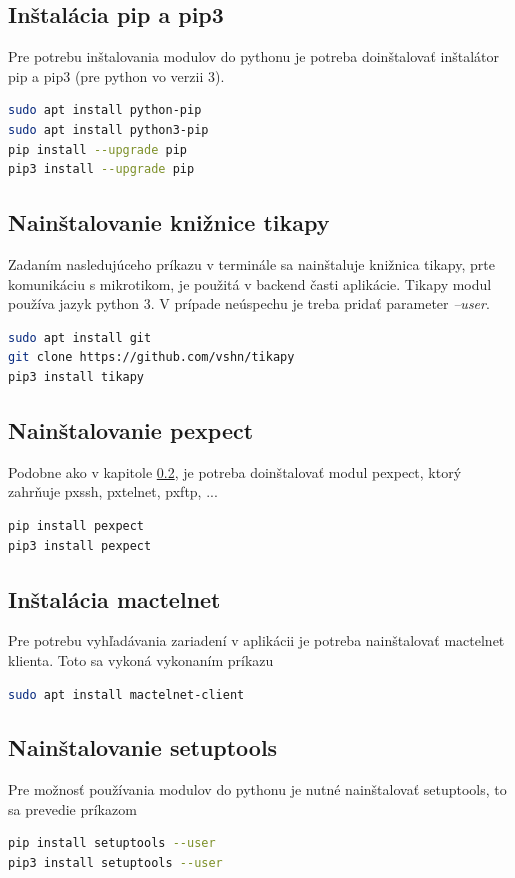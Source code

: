 \subsection{Inštalácia pip a pip3}
Pre potrebu inštalovania modulov do pythonu je potreba doinštalovať inštalátor pip a pip3 (pre python vo verzii 3).
\begin{lstlisting}[language=bash, frame=single, caption=Nainštalovanie pip,captionpos=b, showstringspaces=false]
sudo apt install python-pip
sudo apt install python3-pip
pip install --upgrade pip
pip3 install --upgrade pip
\end{lstlisting}
\subsection{Nainštalovanie knižnice tikapy}
\label{sec:tikapy}
Zadaním nasledujúceho príkazu v terminále sa nainštaluje knižnica tikapy, prte komunikáciu s mikrotikom, je použitá v backend časti aplikácie. Tikapy modul používa jazyk python 3. V prípade neúspechu je treba pridať parameter \textit{--user}.
\begin{lstlisting}[language=bash, frame=single, caption=Nainštalovanie tikapy,captionpos=b, showstringspaces=false]
sudo apt install git
git clone https://github.com/vshn/tikapy
pip3 install tikapy
\end{lstlisting}
\subsection{Nainštalovanie pexpect}
Podobne ako v kapitole \ref{sec:tikapy}, je potreba doinštalovať modul pexpect, ktorý zahrňuje pxssh, pxtelnet, pxftp, ...
\begin{lstlisting}[language=bash, frame=single, caption=Nainštalovanie pexpect,captionpos=b, showstringspaces=false]
pip install pexpect
pip3 install pexpect
\end{lstlisting}
\subsection{Inštalácia mactelnet}
Pre potrebu vyhľadávania zariadení v aplikácii je potreba nainštalovať mactelnet klienta. Toto sa vykoná vykonaním príkazu
\begin{lstlisting}[language=bash, frame=single, caption=Nainštalovanie mactelnet,captionpos=b, showstringspaces=false]
sudo apt install mactelnet-client
\end{lstlisting}
\subsection{Nainštalovanie setuptools}
Pre možnosť používania modulov do pythonu je nutné nainštalovať setuptools, to sa prevedie príkazom
\begin{lstlisting}[language=bash, frame=single, caption=Nainštalovanie setuptools,captionpos=b, showstringspaces=false]
pip install setuptools --user
pip3 install setuptools --user
\end{lstlisting}
